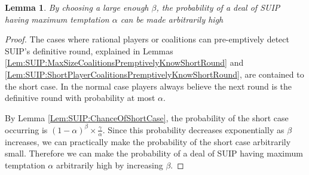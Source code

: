 \documentclass{dalcsthesis}
\newtheorem{lemma}{Lemma}
\begin{document}
\begin{lemma} By choosing a large enough $\beta$, the probability of a deal of SUIP having maximum temptation $\alpha$ can be made arbitrarily high \label{Lem:SUIP:HighTemptationAvoidable} \end{lemma}
\begin{proof}
The cases where rational players or coalitions can pre-emptively detect SUIP's definitive round, explained in Lemmas \ref{Lem:SUIP:MaxSizeCoalitionsPremptivelyKnowShortRound} and \ref{Lem:SUIP:ShortPlayerCoalitionsPremptivelyKnowShortRound}, are contained to the short case. In the normal case players always believe the next round is the definitive round with probability at most $\alpha$.

By Lemma \ref{Lem:SUIP:ChanceOfShortCase}, the probability of the short case occurring is $(1-\alpha)^\beta \times \frac{\gamma}{\alpha}$. Since this probability decreases exponentially as $\beta$ increases, we can practically make the probability of the short case arbitrarily small. Therefore we can make the probability of a deal of SUIP having maximum temptation $\alpha$ arbitrarily high by increasing $\beta$.
\end{proof}
\end{document}
